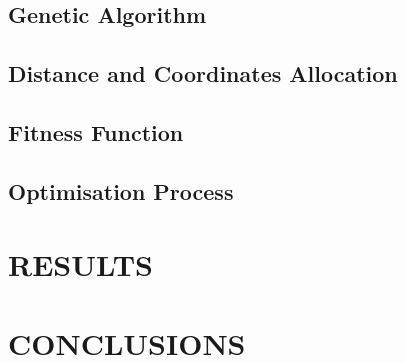 \documentclass[a4paper, 10pt]{IEEEconf}
\begin{document}

\subsection{Genetic Algorithm}


\subsection{Distance and Coordinates Allocation}


\subsection{Fitness Function}


\subsection{Optimisation Process}


\section{RESULTS}






\section{CONCLUSIONS}
\end{document}
